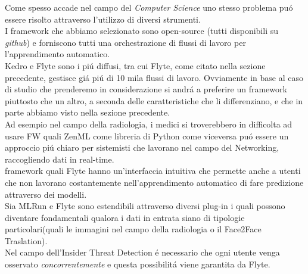 \documentclass[../tesi.tex]{subfiles}
\begin{document}
Come spesso accade nel campo del \textit{Computer Science} uno stesso problema puó essere risolto attraverso l'utilizzo di diversi strumenti.\\
I framework che abbiamo selezionato sono open-source (tutti disponibili su \textit{github}) e forniscono tutti una  orchestrazione di flussi di lavoro per l'apprendimento automatico.\\
Kedro e Flyte sono i piú diffusi, tra cui Flyte, come citato nella sezione precedente, gestisce giá piú di 10 mila flussi di lavoro.
Ovviamente in base al caso di studio che prenderemo in considerazione si andrá a preferire un \Gls{framework} piuttosto che un altro, a seconda delle caratteristiche che li differenziano, e che in parte abbiamo visto nella sezione precedente.\\
Ad esempio nel campo della radiologia, i medici si troverebbero in difficolta ad usare FW quali ZenML come libreria di Python come viceversa puó essere un approccio piú chiaro per sistemisti che lavorano nel campo del Networking, raccogliendo dati in real-time.\\
\Gls{framework} quali Flyte hanno un'interfaccia intuitiva che permette anche a utenti che non lavorano costantemente nell'apprendimento automatico di fare predizione attraverso dei modelli.\\
Sia MLRun e Flyte sono estendibili attraverso diversi plug-in i quali possono diventare fondamentali qualora i dati in entrata siano di tipologie particolari(quali le immagini nel campo della radiologia o il Face2Face Traslation).\\
Nel campo dell'Insider Threat Detection é necessario che ogni utente venga osservato \textit{concorrentemente} e questa possibilitá viene garantita da Flyte.
\end{document}
